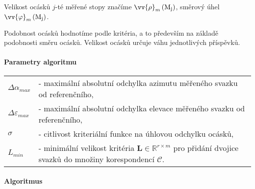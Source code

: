 	Velikost ocásků $j$-té měřené stopy značíme $\vv{\rho}_{m}\left(\mathrm{M_j}\right)$, směrový úhel $\vv{\varphi}_{m}\left(\mathrm{M_j}\right)$. 
	 
	 Podobnost ocásků hodnotíme podle kritéria, a to především na základě podobnosti směru ocásků. Velikost ocásků určuje váhu jednotlivých příspěvků.
	 
\paragraph{Parametry algoritmu}
\hspace{1mm}
	 
	 \begin{tabular}{l l}
	 $\Delta\alpha_{max}$ & - maximální absolutní odchylka azimutu měřeného svazku od referenčního,\\
	 $\Delta\varepsilon_{max}$ & - maximální absolutní odchylka elevace měřeného svazku od referenčního,\\
	 $\sigma$ & - citlivost kriteriální funkce na úhlovou odchylku ocásků,\\
	 $L_{min}$ &  - minimální velikost kritéria  $\mathbf{L} \in \mathbb{R}^{r\times m}$ pro přidání dvojice svazků do množiny korespondencí $\mathcal{C}$. \\
	 \end{tabular}
	
\paragraph{Algoritmus}

